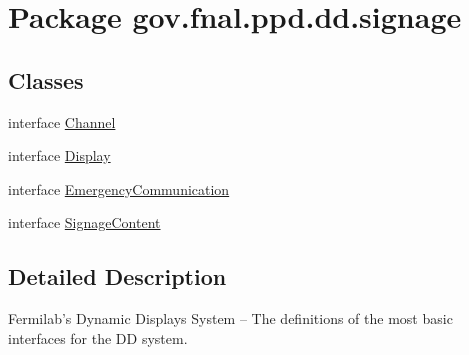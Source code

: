 \hypertarget{namespacegov_1_1fnal_1_1ppd_1_1dd_1_1signage}{\section{Package gov.\-fnal.\-ppd.\-dd.\-signage}
\label{namespacegov_1_1fnal_1_1ppd_1_1dd_1_1signage}
}
\subsection*{Classes}
\begin{DoxyCompactItemize}
\item 
interface \hyperlink{interfacegov_1_1fnal_1_1ppd_1_1dd_1_1signage_1_1Channel}{Channel}
\item 
interface \hyperlink{interfacegov_1_1fnal_1_1ppd_1_1dd_1_1signage_1_1Display}{Display}
\item 
interface \hyperlink{interfacegov_1_1fnal_1_1ppd_1_1dd_1_1signage_1_1EmergencyCommunication}{Emergency\-Communication}
\item 
interface \hyperlink{interfacegov_1_1fnal_1_1ppd_1_1dd_1_1signage_1_1SignageContent}{Signage\-Content}
\end{DoxyCompactItemize}


\subsection{Detailed Description}
Fermilab's Dynamic Displays System -- The definitions of the most basic interfaces for the D\-D system.